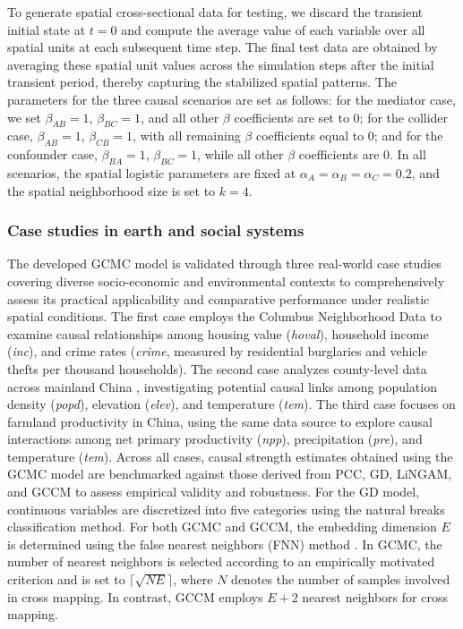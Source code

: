 \documentclass[authoryear,preprint,review,12pt]{elsarticle}
\begin{document}
To generate spatial cross-sectional data for testing, we discard the transient initial state at \(t=0\) and compute the average value of each variable over all spatial units at each subsequent time step. The final test data are obtained by averaging these spatial unit values across the simulation steps after the initial transient period, thereby capturing the stabilized spatial patterns. The parameters for the three causal scenarios are set as follows: for the mediator case, we set \(\beta_{AB}=1\), \(\beta_{BC}=1\), and all other \(\beta\) coefficients are set to $0$; for the collider case, \(\beta_{AB}=1\), \(\beta_{CB}=1\), with all remaining \(\beta\) coefficients equal to $0$; and for the confounder case, \(\beta_{BA}=1\), \(\beta_{BC}=1\), while all other \(\beta\) coefficients are $0$. In all scenarios, the spatial logistic parameters are fixed at \(\alpha_A = \alpha_B = \alpha_C = 0.2\), and the spatial neighborhood size is set to \(k=4\).

\subsubsection{Case studies in earth and social systems}

The developed GCMC model is validated through three real-world case studies covering diverse socio-economic and environmental contexts to comprehensively assess its practical applicability and comparative performance under realistic spatial conditions. The first case employs the Columbus Neighborhood Data \citep{r-spData} to examine causal relationships among housing value (\textit{hoval}), household income (\textit{inc}), and crime rates (\textit{crime}, measured by residential burglaries and vehicle thefts per thousand households). The second case analyzes county-level data across mainland China \citep{gao2023gccm}, investigating potential causal links among population density (\textit{popd}), elevation (\textit{elev}), and temperature (\textit{tem}). The third case focuses on farmland productivity in China, using the same data source \citep{gao2023gccm} to explore causal interactions among net primary productivity (\textit{npp}), precipitation (\textit{pre}), and temperature (\textit{tem}). Across all cases, causal strength estimates obtained using the GCMC model are benchmarked against those derived from PCC, GD, LiNGAM, and  GCCM to assess empirical validity and robustness. For the GD model, continuous variables are discretized into five categories using the natural breaks classification method. For both GCMC and GCCM, the embedding dimension $E$ is determined using the false nearest neighbors (FNN) method \citep{kennel1992fnn}. In GCMC, the number of nearest neighbors is selected according to an empirically motivated criterion and is set to $\lceil \sqrt{N E} \rceil$, where $N$ denotes the number of samples involved in cross mapping. In contrast, GCCM employs $E + 2$ nearest neighbors for cross mapping. 
\end{document}

